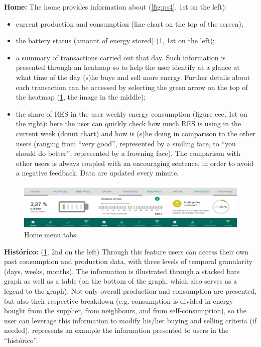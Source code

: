 \textbf{Home:}
The home provides information about (\cref{fig:ps4}, 1st on the left):
\begin{itemize}
    \item current production and consumption (line chart on the top of the screen);
    \item the battery status (amount of energy stored) (\cref{fig:ps5}, 1st on the left);
    \item a summary of transactions carried out that day. Such information is presented through an heatmap so to help the user identify at a glance at what time of the day (s)he buys and sell more energy. Further details about each transaction can be accessed by selecting the green arrow on the top of the heatmap (\cref{fig:ps5}, the image in the middle);
    \item the share of RES in the user weekly energy consumption (figure eee, 1st on the right): here the user can quickly check how much RES is using in the current week (donut chart) and how is (s)he doing in comparison to the other users (ranging from “very good”, represented by a smiling face, to “you should do better”, represented by a frowning face). The comparison with other users is always coupled with an encouraging sentence, in order to avoid a negative feedback. Data are updated every minute.
\end{itemize}

\begin{figure}[h]
\centering
\includegraphics[width=1\textwidth]{./Images/ps5}
\caption{Home menu tabs}
\label{fig:ps5}
\end{figure}
\textbf{Histórico:} (\cref{fig:ps5}, 2nd on the left)
Through this feature users can access their own past consumption and production data, with three levels of temporal granularity (days, weeks, months). The information is illustrated through a stacked bars graph as well as a table (on the bottom of the graph, which also serves as a legend to the graph). Not only overall production and consumption are presented, but also their respective breakdown (e.g. consumption is divided in energy bought from the supplier, from neighbours, and from self-consumption), so the user can leverage this information to modify his/her buying and selling criteria (if needed).
 represents an example the information presented to users in the “histórico”.

